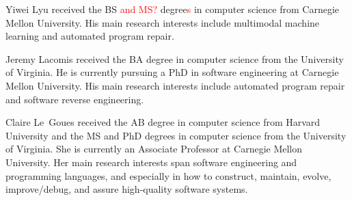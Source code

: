 \documentclass[10pt,journal,compsoc]{IEEEtran}
\newcommand\todo[1]{\textcolor{red}{#1}}
\begin{document}
\begin{IEEEbiography}{Yiwei Lyu}
    received the BS \todo{and MS?} degree\todo{s} in computer science from Carnegie Mellon University.
    His main research interests include multimodal machine learning and automated program repair.
\end{IEEEbiography}


\begin{IEEEbiography}{Jeremy Lacomis}
received the BA degree in computer science from the University of Virginia. He
is currently pursuing a PhD in software engineering at Carnegie Mellon
University. His main research interests include automated program repair and
software reverse engineering.
\end{IEEEbiography}

\begin{IEEEbiography}{Claire Le~Goues}
received the AB degree in computer science from Harvard University and the MS
and PhD degrees in computer science from the University of Virginia. She is
currently an Associate Professor at Carnegie Mellon University. Her main
research interests span software engineering and programming languages, and
especially in how to construct, maintain, evolve, improve/debug, and assure
high-quality software systems.
\end{IEEEbiography}
\end{document}
